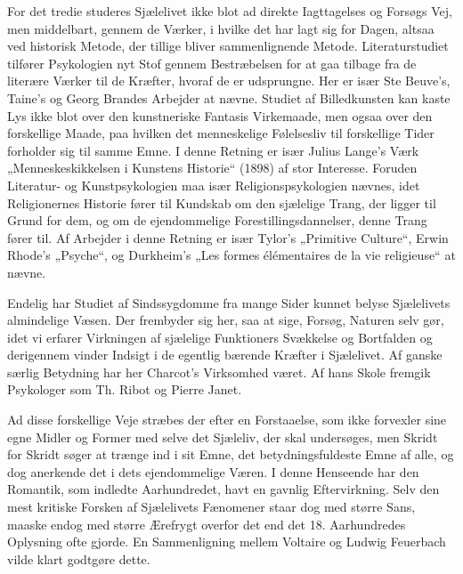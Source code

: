 \documentclass[12pt,a4paper,openany]{book}
\newcommand{\opage}[1]{\marginnote{\footnotesize\textit{[#1]}}}
\begin{document}
For det tredie studeres Sjælelivet ikke blot ad direkte Iagttagelses
og Forsøgs Vej, men middelbart, gennem de Værker, i hvilke det
har lagt sig for Dagen, altsaa ved historisk Metode, der tillige bliver
sammenlignende Metode. Literaturstudiet tilfører Psykologien nyt
Stof gennem Bestræbelsen for at gaa tilbage fra de literære Værker
\opage{49}til de Kræfter, hvoraf de er udsprungne. Her er især Ste Beuve’s,
Taine’s og Georg Brandes Arbejder at nævne. Studiet af Billedkunsten
kan kaste Lys ikke blot over den kunstneriske Fantasis Virkemaade,
men ogsaa over den forskellige Maade, paa hvilken det menneskelige
Følelsesliv til forskellige Tider forholder sig til samme
Emne. I denne Retning er især Julius Lange’s Værk „Menneskeskikkelsen
i Kunstens Historie“ (1898) af stor Interesse. Foruden
Literatur- og Kunstpsykologien maa især Religionspsykologien nævnes,
idet Religionernes Historie fører til Kundskab om den sjælelige
Trang, der ligger til Grund for dem, og om de ejendommelige Forestillingsdannelser,
denne Trang fører til. Af Arbejder i denne Retning
er især Tylor’s „Primitive Culture“, Erwin Rhode’s „Psyche“, og
Durkheim’s „Les formes élémentaires de la vie religieuse“ at nævne.

Endelig har Studiet af Sindssygdomme fra mange Sider kunnet
belyse Sjælelivets almindelige Væsen. Der frembyder sig her, saa at
sige, Forsøg, Naturen selv gør, idet vi erfarer Virkningen af sjælelige
Funktioners Svækkelse og Bortfalden og derigennem vinder Indsigt
i de egentlig bærende Kræfter i Sjælelivet. Af ganske særlig Betydning
har her Charcot’s Virksomhed været. Af hans Skole fremgik
Psykologer som Th. Ribot og Pierre Janet.

Ad disse forskellige Veje stræbes der efter en Forstaaelse, som
ikke forvexler sine egne Midler og Former med selve det Sjæleliv,
der skal undersøges, men Skridt for Skridt søger at trænge ind i sit
Emne, det betydningsfuldeste Emne af alle, og dog anerkende det
i dets ejendommelige Væren. I denne Henseende har den Romantik,
som indledte Aarhundredet, havt en gavnlig Eftervirkning. Selv den
mest kritiske Forsken af Sjælelivets Fænomener staar dog med
større Sans, maaske endog med større Ærefrygt overfor det end det
18. Aarhundredes Oplysning ofte gjorde. En Sammenligning mellem
Voltaire og Ludwig Feuerbach vilde klart godtgøre dette.
\end{document}
